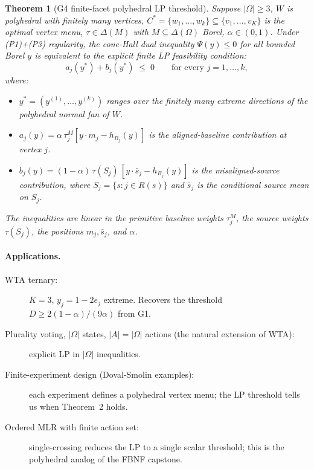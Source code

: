 \documentclass[11pt]{article}
\newtheorem{theorem}{Theorem}
\theoremstyle{definition}
\theoremstyle{remark}
\begin{document}
\begin{theorem}[G4 finite-facet polyhedral LP threshold]\label{thm:G4}
Suppose $|\Omega|\ge 3$, $W$ is polyhedral with finitely many vertices,
$C^* = \{w_1, \ldots, w_k\}\subseteq\{v_1, \ldots, v_K\}$ is the
optimal vertex menu, $\tau\in\Delta(M)$ with $M\subseteq\Delta(\Omega)$
Borel, $\alpha\in(0,1)$. Under (P1)+(P3) regularity, the cone-Hall
dual inequality $\Psi(y)\le 0$ for all bounded Borel $y$ is equivalent
to the explicit finite LP feasibility condition:
\[
a_j(y^*) + b_j(y^*) \;\le\; 0 \qquad\text{for every }j = 1, \ldots, k,
\]
where:
\begin{itemize}
  \item $y^* = (y^{(1)}, \ldots, y^{(k)})$ ranges over the finitely many
    extreme directions of the polyhedral normal fan of $W$.
  \item $a_j(y) = \alpha\,\tau_j^M[y\!\cdot m_j - h_{B_j}(y)]$ is the
    aligned-baseline contribution at vertex $j$.
  \item $b_j(y) = (1-\alpha)\,\tau(S_j)\,[y\!\cdot\bar s_j - h_{B_j}(y)]$
    is the misaligned-source contribution, where $S_j = \{s : j\in R(s)\}$
    and $\bar s_j$ is the conditional source mean on $S_j$.
\end{itemize}
The inequalities are linear in the primitive baseline weights $\tau_j^M$,
the source weights $\tau(S_j)$, the positions $m_j, \bar s_j$, and $\alpha$.
\end{theorem}

\paragraph{Applications.}
\begin{description}
  \item[WTA ternary:] $K = 3$, $y_j = 1 - 2e_j$ extreme. Recovers the
    threshold $D \ge 2(1-\alpha)/(9\alpha)$ from G1.
  \item[Plurality voting, $|\Omega|$ states, $|A| = |\Omega|$ actions
    (the natural extension of WTA):] explicit LP in $|\Omega|$
    inequalities.
  \item[Finite-experiment design (Doval-Smolin examples):] each
    experiment defines a polyhedral vertex menu; the LP threshold
    tells us when Theorem~2 holds.
  \item[Ordered MLR with finite action set:] single-crossing reduces
    the LP to a single scalar threshold; this is the polyhedral
    analog of the FBNF capstone.
\end{description}
\end{document}
